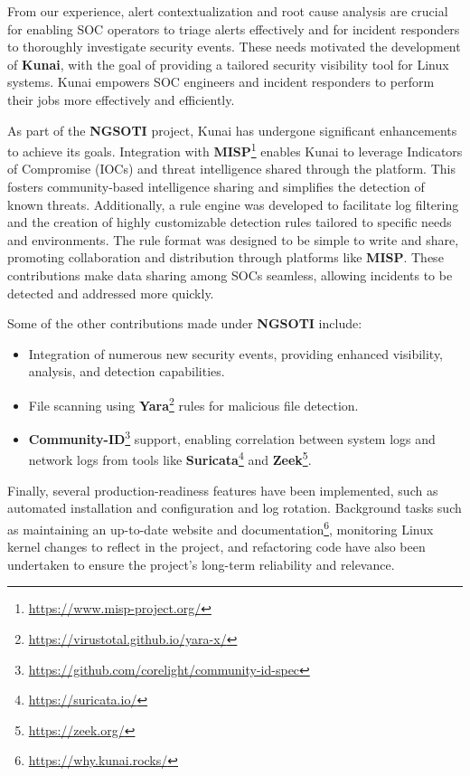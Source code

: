 From our experience, alert contextualization and root cause analysis are crucial for enabling SOC operators to triage alerts effectively and for incident responders to thoroughly investigate security events. These needs motivated the development of \textbf{Kunai}, with the goal of providing a tailored security visibility tool for Linux systems. Kunai empowers SOC engineers and incident responders to perform their jobs more effectively and efficiently.

As part of the \textbf{NGSOTI} project, Kunai has undergone significant enhancements to achieve its goals. Integration with \textbf{MISP}\footnote{\href{https://www.misp-project.org/}{https://www.misp-project.org/}} enables Kunai to leverage Indicators of Compromise (IOCs) and threat intelligence shared through the platform. This fosters community-based intelligence sharing and simplifies the detection of known threats. Additionally, a rule engine was developed to facilitate log filtering and the creation of highly customizable detection rules tailored to specific needs and environments. The rule format was designed to be simple to write and share, promoting collaboration and distribution through platforms like \textbf{MISP}. These contributions make data sharing among SOCs seamless, allowing incidents to be detected and addressed more quickly.

Some of the other contributions made under \textbf{NGSOTI} include:
\begin{itemize}
	\item Integration of numerous new security events, providing enhanced visibility, analysis, and detection capabilities.
	\item File scanning using \textbf{Yara}\footnote{\href{https://virustotal.github.io/yara-x/}{https://virustotal.github.io/yara-x/}} rules for malicious file detection.
	\item \textbf{Community-ID}\footnote{\href{https://github.com/corelight/community-id-spec}{https://github.com/corelight/community-id-spec}} support, enabling correlation between system logs and network logs from tools like \textbf{Suricata}\footnote{\href{https://suricata.io/}{https://suricata.io/}} and \textbf{Zeek}\footnote{\href{https://zeek.org/}{https://zeek.org/}}.
\end{itemize}

Finally, several production-readiness features have been implemented, such as automated installation and configuration and log rotation. Background tasks such as maintaining an up-to-date website and documentation\footnote{\href{https://why.kunai.rocks/}{https://why.kunai.rocks/}}, monitoring Linux kernel changes to reflect in the project, and refactoring code have also been undertaken to ensure the project's long-term reliability and relevance.


